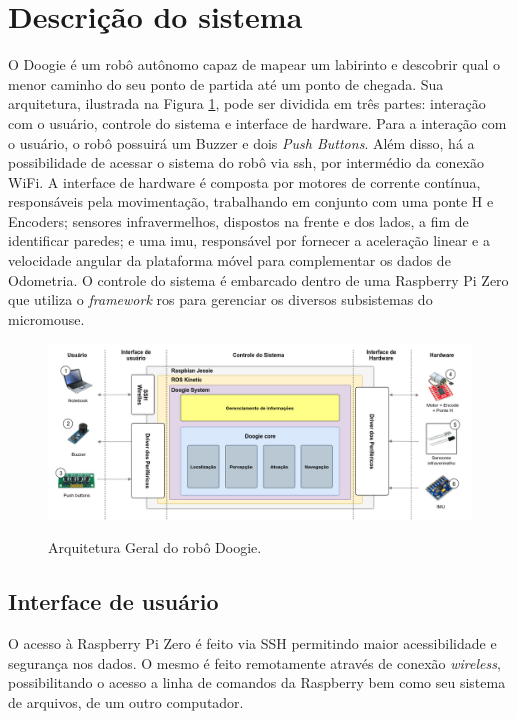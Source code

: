 \section{Descrição do sistema}
\label{sec:descricao_do_sistema}
O Doogie é um robô autônomo capaz de mapear um labirinto e descobrir qual o menor caminho do seu ponto de partida até um ponto de chegada. Sua arquitetura, ilustrada na Figura \ref{fig:arquitetura_geral}, pode ser dividida em três partes: interação com o usuário, controle do sistema e interface de hardware.
Para a interação com o usuário, o robô possuirá um Buzzer e dois \textit{Push Buttons}. Além disso, há a possibilidade de acessar o sistema do robô via \gls*{ssh}, por intermédio da conexão WiFi. A interface de hardware é composta por motores de corrente contínua, responsáveis pela movimentação, trabalhando em conjunto com uma ponte H e Encoders; sensores infravermelhos, dispostos na frente e dos lados, a fim de identificar paredes; e uma \gls*{imu}, responsável por fornecer a aceleração linear e a velocidade angular da plataforma móvel para complementar os dados de Odometria. O controle do sistema é embarcado dentro de uma Raspberry Pi Zero que utiliza o \textit{framework} \gls*{ros} para gerenciar os diversos subsistemas do micromouse.

\begin{figure}[H]
	\centering
	\caption{Arquitetura Geral do robô Doogie.}
	\includegraphics[width=1\textwidth]
	{Figures/arquitetura_geral}
	\label{fig:arquitetura_geral}
\end{figure}

\subsection{Interface de usuário}
\label{ssec:interface_de_usuario}
O acesso à Raspberry Pi Zero é feito via SSH permitindo maior acessibilidade e segurança nos dados. O mesmo é feito remotamente através de conexão \textit{wireless}, possibilitando o acesso a linha de comandos da Raspberry bem como seu sistema de arquivos, de um outro computador.
 
